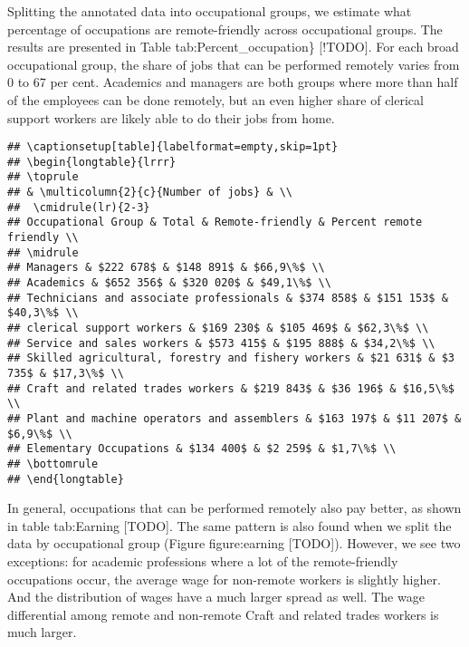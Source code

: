 \documentclass[11pt,]{article}
\begin{document}
Splitting the annotated data into occupational groups, we estimate what
percentage of occupations are remote-friendly across occupational
groups. The results are presented in Table tab:Percent\_occupation\}
{[}!TODO{]}. For each broad occupational group, the share of jobs that
can be performed remotely varies from 0 to 67 per cent. Academics and
managers are both groups where more than half of the employees can be
done remotely, but an even higher share of clerical support workers are
likely able to do their jobs from home.

\begin{verbatim}
## \captionsetup[table]{labelformat=empty,skip=1pt}
## \begin{longtable}{lrrr}
## \toprule
## & \multicolumn{2}{c}{Number of jobs} & \\ 
##  \cmidrule(lr){2-3}
## Occupational Group & Total & Remote-friendly & Percent remote friendly \\ 
## \midrule
## Managers & $222 678$ & $148 891$ & $66,9\%$ \\ 
## Academics & $652 356$ & $320 020$ & $49,1\%$ \\ 
## Technicians and associate professionals & $374 858$ & $151 153$ & $40,3\%$ \\ 
## clerical support workers & $169 230$ & $105 469$ & $62,3\%$ \\ 
## Service and sales workers & $573 415$ & $195 888$ & $34,2\%$ \\ 
## Skilled agricultural, forestry and fishery workers & $21 631$ & $3 735$ & $17,3\%$ \\ 
## Craft and related trades workers & $219 843$ & $36 196$ & $16,5\%$ \\ 
## Plant and machine operators and assemblers & $163 197$ & $11 207$ & $6,9\%$ \\ 
## Elementary Occupations & $134 400$ & $2 259$ & $1,7\%$ \\ 
## \bottomrule
## \end{longtable}
\end{verbatim}

In general, occupations that can be performed remotely also pay better,
as shown in table tab:Earning {[}TODO{]}. The same pattern is also found
when we split the data by occupational group (Figure figure:earning
{[}TODO{]}). However, we see two exceptions: for academic professions
where a lot of the remote-friendly occupations occur, the average wage
for non-remote workers is slightly higher. And the distribution of wages
have a much larger spread as well. The wage differential among remote
and non-remote Craft and related trades workers is much larger.
\end{document}
